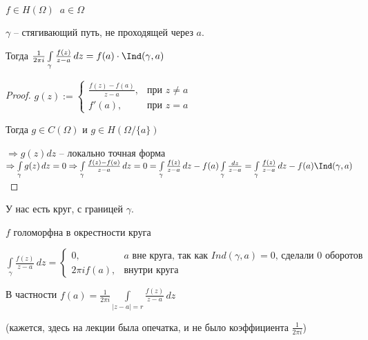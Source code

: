 \begin{theorem}\thmslashn
	
	$f\in H(\Omega) \;\; a\in \Omega$
	
	$\gamma$ -- стягивающий путь, не проходящей через $a$. 
	
	Тогда $\frac{1}{2\pi i}\int\limits_\gamma \frac{f(z)}{z-a}\,dz = f(a)\cdot \Ind(\gamma, a)$
	
\end{theorem}

\begin{proof}\thmslashn
	
	$
	g(z) :=
	\begin{cases}
		\frac{f(z) - f(a)}{z-a}, & \text{при } z \not = a \\
		f'(a), & \text{при } z = a
	\end{cases}
	$
	
	Тогда $g \in C(\Omega)$ и $g\in H(\Omega/\{a\})$
	
	$\Rightarrow g(z)dz$ -- локально точная форма $\Rightarrow \int\limits_\gamma g(z)\,dz = 0 \Rightarrow \int\limits_\gamma \frac{f(z) - f(a)}{z-a}\,dz = 0 = \int\limits_\gamma \frac{f(z)}{z-a}\,dz - f(a) \int\limits_\gamma \frac{dz}{z-a} = \int\limits_\gamma \frac{f(z)}{z-a}\,dz - f(a) \Ind(\gamma, a)$
\end{proof}

\begin{example}\thmslashn
	
	У нас есть круг, с границей $\gamma$. 
	
	$f$ голоморфна в окрестности круга
	
	$\int\limits_\gamma \frac{f(z)}{z-a}\,dz = 
	\begin{cases}
        0, & a \text{ вне круга, так как } Ind(\gamma, a) = 0 \text{, сделали 0 оборотов}\\
	2\pi i f(a), & \text{внутри круга}
	\end{cases}$
	
    В частности $f(a) = \frac{1}{2\pi i} \int\limits_{|z-a| = r} \frac{f(z)}{z-a}\,dz$

    (кажется, здесь на лекции была опечатка, и не было коэффициента $\frac{1}{2\pi i}$)
\end{example}